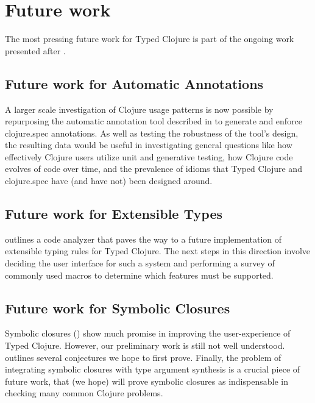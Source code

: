 \documentclass{book}
\begin{document}


\chapter{Future work}

The most pressing future work for Typed Clojure is part of the ongoing work
presented after .

\section{Future work for Automatic Annotations}
A larger scale investigation of Clojure usage patterns is now possible by
repurposing the automatic annotation tool described in 
to generate and enforce clojure.spec annotations.
As well as testing the robustness of the tool's design, 
the resulting data would be
useful in investigating general questions like how effectively Clojure users utilize unit and generative testing,
how Clojure code evolves of code over time, and the prevalence of idioms that Typed Clojure and clojure.spec
have (and have not) been designed around.

\section{Future work for Extensible Types}
 outlines a code analyzer that paves the way to a future implementation
of extensible typing rules for Typed Clojure.
The next steps in this direction involve deciding the user interface for such a system
and performing a survey of commonly used macros to determine which features must be supported.

\section{Future work for Symbolic Closures}
Symbolic closures ()
show much promise in improving the user-experience of Typed Clojure.
However, our preliminary work is still not well understood.
 outlines several conjectures we hope to first prove.
Finally, the problem of integrating symbolic closures with type argument synthesis
is a crucial piece of future work, that (we hope) will prove symbolic closures
as indispensable in checking many common Clojure problems.
\end{document}
